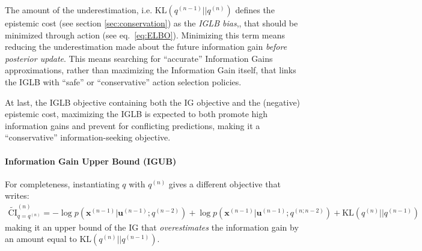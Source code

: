 \documentclass[12pt,twoside,openright]{article}
\begin{document}
{\color{Purple} The amount of the} underestimation, {\color{Purple} i.e. $\text{KL} (q^{(n-1)}||q^{(n)})$} {\color{Purple} defines the epistemic cost (see section \ref{sec:conservation}) as the \emph{IGLB bias},}, that should be minimized through action (see eq.~\ref{eq:ELBO}).  Minimizing this term means reducing the underestimation made about the future information gain \emph{before posterior update}. {\color{Purple} This means searching for ``accurate'' Information Gains approximations, rather than maximizing the Information Gain itself, that links the IGLB with ``safe'' or ``conservative'' action selection policies. }

{\color{Purple} At last, the IGLB objective containing both the IG objective and the (negative) epistemic cost, maximizing the IGLB is expected to both promote high information gains and prevent for conflicting predictions, making it a ``conservative'' information-seeking objective.}

\paragraph{Information Gain Upper Bound (IGUB)}
{\color{Purple}For completeness, } instantiating $q$ with $q^{(n)}$ gives a different objective  that writes:
\begin{align}
	\tilde{\text{CI}}^{(n)}_{q = q^{(n)}} = 
	-\log p(\boldsymbol{x}^{(n-1)}|\boldsymbol{u}^{(n-1)}; q^{(n-2)}) 
	+ \log p(\boldsymbol{x}^{(n-1)}|\boldsymbol{u}^{(n-1)}; q^{(n;n-2)}) + \text{KL} (q^{(n)}||q^{(n-1)})
\end{align}
making it {\color{Purple} an upper bound of the IG that} \emph{overestimates} the information gain by an amount equal to $\text{KL} (q^{(n)}||q^{(n-1)})$. 
\end{document}
